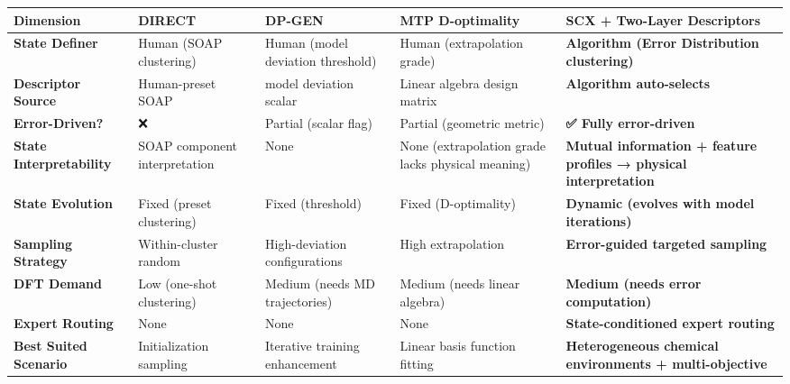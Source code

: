 \documentclass[
  12pt,
]{article}
\begin{document}
\begin{longtable}[]{@{}
  >{\raggedright\arraybackslash}p{}
  >{\raggedright\arraybackslash}p{}
  >{\raggedright\arraybackslash}p{}
  >{\raggedright\arraybackslash}p{}
  >{\raggedright\arraybackslash}p{}@{}}
\toprule\noalign{}
\begin{minipage}[b]{\linewidth}\raggedright
Dimension
\end{minipage} & \begin{minipage}[b]{\linewidth}\raggedright
DIRECT
\end{minipage} & \begin{minipage}[b]{\linewidth}\raggedright
DP-GEN
\end{minipage} & \begin{minipage}[b]{\linewidth}\raggedright
MTP D-optimality
\end{minipage} & \begin{minipage}[b]{\linewidth}\raggedright
\textbf{SCX + Two-Layer Descriptors}
\end{minipage} \\
\midrule\noalign{}
\endhead
\bottomrule\noalign{}
\endlastfoot
\textbf{State Definer} & Human (SOAP clustering) & Human (model deviation threshold) & Human (extrapolation grade) & \textbf{Algorithm (Error Distribution clustering)} \\
\textbf{Descriptor Source} & Human-preset SOAP & model deviation scalar & Linear algebra design matrix & \textbf{Algorithm auto-selects} \\
\textbf{Error-Driven?} & ❌ & Partial (scalar flag) & Partial (geometric metric) & \textbf{✅ Fully error-driven} \\
\textbf{State Interpretability} & SOAP component interpretation & None & None (extrapolation grade lacks physical meaning) & \textbf{Mutual information + feature profiles → physical interpretation} \\
\textbf{State Evolution} & Fixed (preset clustering) & Fixed (threshold) & Fixed (D-optimality) & \textbf{Dynamic (evolves with model iterations)} \\
\textbf{Sampling Strategy} & Within-cluster random & High-deviation configurations & High extrapolation & \textbf{Error-guided targeted sampling} \\
\textbf{DFT Demand} & Low (one-shot clustering) & Medium (needs MD trajectories) & Medium (needs linear algebra) & \textbf{Medium (needs error computation)} \\
\textbf{Expert Routing} & None & None & None & \textbf{State-conditioned expert routing} \\
\textbf{Best Suited Scenario} & Initialization sampling & Iterative training enhancement & Linear basis function fitting & \textbf{Heterogeneous chemical environments + multi-objective} \\
\end{longtable}
\end{document}

